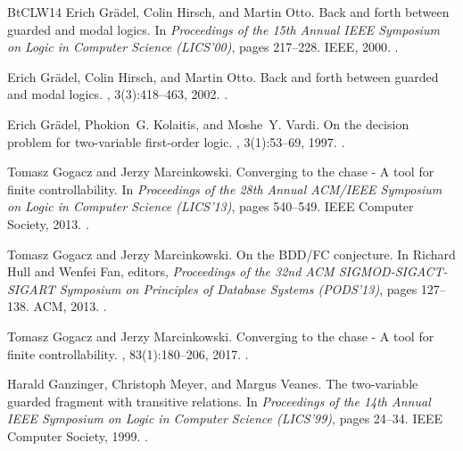 \documentclass[10pt,a4paper]{amsart}
\theoremstyle{definition}
\numberwithin{equation}{section}
\theoremstyle{plain}
\theoremstyle{definition}
\theoremstyle{myexample}
\theoremstyle{plain}
\theoremstyle{definition}
\begin{document}
\begin{thebibliography}{BtCLW14}
Erich Gr{\"{a}}del, Colin Hirsch, and Martin Otto.
\newblock Back and forth between guarded and modal logics.
\newblock In {\em Proceedings of the 15th Annual {IEEE} Symposium on Logic in
  Computer Science (LICS'00)}, pages 217--228. {IEEE}, 2000.
\newblock \href {https://doi.org/10.1109/LICS.2000.855771}
  {}.

Erich Gr{\"{a}}del, Colin Hirsch, and Martin Otto.
\newblock Back and forth between guarded and modal logics.
, 3(3):418--463, 2002.
\newblock \href {https://doi.org/10.1145/507382.507388}
  {}.

Erich Gr{\"{a}}del, Phokion~G. Kolaitis, and Moshe~Y. Vardi.
\newblock On the decision problem for two-variable first-order logic.
, 3(1):53--69, 1997.
\newblock \href {https://doi.org/10.2307/421196} {}.

Tomasz Gogacz and Jerzy Marcinkowski.
\newblock Converging to the chase - {A} tool for finite controllability.
\newblock In {\em Proceedings of the 28th Annual {ACM/IEEE} Symposium on Logic
  in Computer Science ({LICS}'13)}, pages 540--549. {IEEE} Computer Society,
  2013.
\newblock \href {https://doi.org/10.1109/LICS.2013.61}
  {}.

Tomasz Gogacz and Jerzy Marcinkowski.
\newblock On the {BDD/FC} conjecture.
\newblock In Richard Hull and Wenfei Fan, editors, {\em Proceedings of the 32nd
  {ACM} {SIGMOD-SIGACT-SIGART} Symposium on Principles of Database Systems
  ({PODS}'13)}, pages 127--138. {ACM}, 2013.
\newblock \href {https://doi.org/10.1145/2463664.2463668}
  {}.

Tomasz Gogacz and Jerzy Marcinkowski.
\newblock Converging to the chase - {A} tool for finite controllability.
, 83(1):180--206, 2017.
\newblock \href {https://doi.org/10.1016/j.jcss.2016.08.001}
  {}.

Harald Ganzinger, Christoph Meyer, and Margus Veanes.
\newblock The two-variable guarded fragment with transitive relations.
\newblock In {\em Proceedings of the 14th Annual {IEEE} Symposium on Logic in
  Computer Science (LICS'99)}, pages 24--34. {IEEE} Computer Society, 1999.
\newblock \href {https://doi.org/10.1109/LICS.1999.782582}
  {}.


\end{thebibliography}
\end{document}
